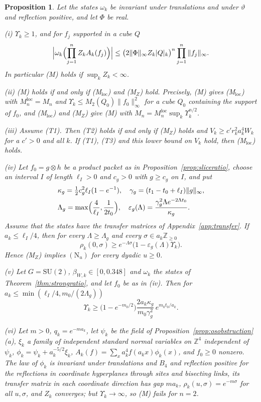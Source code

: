 \documentclass[aps,prd,twocolumn,superscriptaddress,nofootinbib,longbibliography,floatfix,amsmath,amssymb,10pt]{revtex4-2}
\newtheorem{proposition}[theorem]{Proposition}
\theoremstyle{definition}
\theoremstyle{remark}
\newcommand{\Z}{\mathbb{Z}}
\newcommand{\SU}{\mathrm{SU}}
\begin{document}
\begin{proposition}\label{prop:msplit}
Let the states $\omega_k$ be invariant under translations and under
$\vartheta$ and reflection positive, and let $\Phi$ be real.

\textup{(i)} $\Upsilon_k\ge1$, and for $f_j$ supported in a cube $Q$
\[
\Bigl|\omega_k\Bigl(\prod_{j=1}^nZ_kA_k(f_j)\Bigr)\Bigr|\le
\bigl(2\|\Phi\|_\infty Z_k|Q|_k\bigr)^n\prod_{j=1}^n\|f_j\|_\infty .
\]
In particular \textup{(M)} holds if $\sup_kZ_k<\infty$.

\textup{(ii)} \textup{(M)} holds if and only if \textup{(M$_{\mathrm{loc}}$)}
and \textup{(M$_Z$)} hold. Precisely, \textup{(M)} gives
\textup{(M$_{\mathrm{loc}}$)} with $M^{\mathrm{loc}}_n=M_n$ and
$\Upsilon_k\le M_2(Q_0)\|f_0\|_\infty^2$ for a cube $Q_0$ containing the
support of $f_0$, and \textup{(M$_{\mathrm{loc}}$)} and \textup{(M$_Z$)}
give \textup{(M)} with $M_n=M^{\mathrm{loc}}_n\sup_k\Upsilon_k^{n/2}$.

\textup{(iii)} Assume \textup{(T1)}. Then \textup{(T2)} holds if and only
if \textup{(M$_Z$)} holds and $V_k\ge c'r_k^2a_k^4W_k$ for a $c'>0$ and
all $k$. If \textup{(T1)}, \textup{(T3)} and this lower bound on $V_k$
hold, then \textup{(M$_{\mathrm{loc}}$)} holds.

\textup{(iv)} Let $f_0=g\otimes h$ be a product packet as in
Proposition~\textup{\ref{prop:sliceratio}}, choose an interval $I$ of
length $\ell_I>0$ and $c_g>0$ with $g\ge c_g$ on $I$, and put
\[
\begin{split}
&\kappa_g=\tfrac12c_g^2\ell_I(1-e^{-1}),\quad
\gamma_g=(t_1-t_0+\ell_I)\|g\|_\infty,\\
&\Lambda_g=\max\Bigl(\frac4{\ell_I},\frac1{2t_0}\Bigr),\quad
\varepsilon_g(\Lambda)=\frac{\gamma_g^2\Lambda e^{-2\Lambda t_0}}
{\kappa_g}.
\end{split}
\]
Assume that the states have the transfer matrices of
Appendix~\textup{\ref{app:transfer}}. If $a_k\le\ell_I/4$, then for every
$\Lambda\ge\Lambda_g$ and every $\sigma\in a_k\Z_{\ge0}$
\[
\rho_k(0,\sigma)\ge e^{-\Lambda\sigma}\bigl(1-\varepsilon_g(\Lambda)
\Upsilon_k\bigr).
\]
Hence \textup{(M$_Z$)} implies $(\mathrm N_u)$ for every dyadic $u\ge0$.

\textup{(v)} Let $G=\SU(2)$, $\beta_{W,k}\in[0,0.348]$ and $\omega_k$ the
states of Theorem~\textup{\ref{thm:strongratio}}, and let $f_0$ be as in
\textup{(iv)}. Then for $a_k\le\min(\ell_I/4,m_0/(2\Lambda_g))$
\[
\Upsilon_k\ge\bigl(1-e^{-m_0/2}\bigr)\frac{2a_k\kappa_g}{m_0\gamma_g^2}
\,e^{m_0t_0/a_k} .
\]

\textup{(vi)} Let $m>0$, $q_k=e^{-ma_k}$, let $\psi_k$ be the field of
Proposition~\textup{\ref{prop:osobstruction}(a)}, $\xi_k$ a family of
independent standard normal variables on $\Z^4$ independent of $\psi_k$,
$\phi_k=\psi_k+a_k^{-5/2}\xi_k$, $A_k(f)=\sum_xa_k^4f(a_kx)\phi_k(x)$, and
$f_0\ge0$ nonzero. The law of $\phi_k$ is invariant under translations and
$B_4$ and reflection positive for the reflections in coordinate
hyperplanes through sites and bisecting links, its transfer matrix in each
coordinate direction has gap $ma_k$, $\rho_k(u,\sigma)=e^{-m\sigma}$ for
all $u,\sigma$, and $Z_k$ converges; but $\Upsilon_k\to\infty$, so
\textup{(M)} fails for $n=2$.
\end{proposition}
\end{document}

